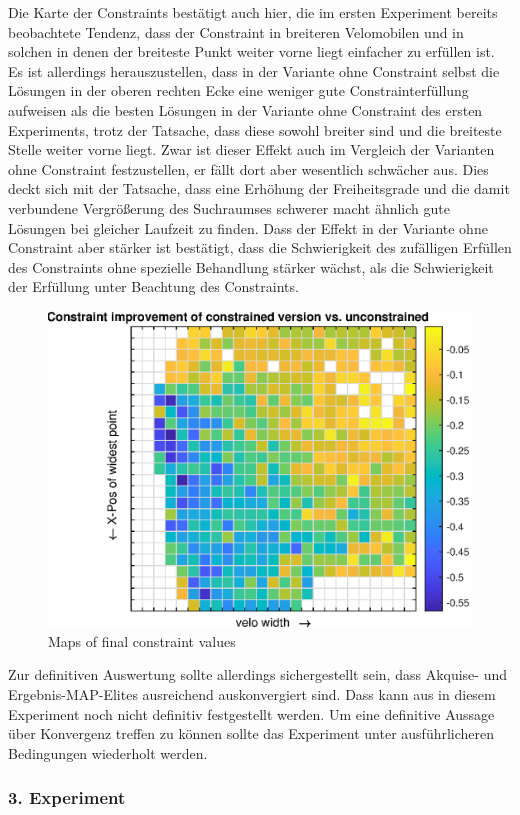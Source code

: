 Die Karte der Constraints bestätigt auch hier, die im ersten Experiment bereits beobachtete Tendenz, dass der Constraint in breiteren Velomobilen und in solchen in denen der breiteste Punkt weiter vorne liegt einfacher zu erfüllen ist.
Es ist allerdings herauszustellen, dass in der Variante ohne Constraint selbst die Lösungen in der oberen rechten Ecke eine weniger gute Constrainterfüllung aufweisen als die besten Lösungen in der Variante ohne Constraint des ersten Experiments, trotz der Tatsache, dass diese sowohl breiter sind und die breiteste Stelle weiter vorne liegt.
Zwar ist dieser Effekt auch im Vergleich der Varianten ohne Constraint festzustellen, er fällt dort aber wesentlich schwächer aus.
Dies deckt sich mit der Tatsache, dass eine Erhöhung der Freiheitsgrade und die damit verbundene Vergrößerung des Suchraumses schwerer macht ähnlich gute Lösungen bei gleicher Laufzeit zu finden.
Dass der Effekt in der Variante ohne Constraint aber stärker ist bestätigt, dass die Schwierigkeit des zufälligen Erfüllen des Constraints ohne spezielle Behandlung stärker wächst, als die Schwierigkeit der Erfüllung unter Beachtung des Constraints.

\begin{figure}[h]
	\centering
	\includegraphics[width=.7\linewidth]{bilder/6pt500Samples/constraintImprovements}
	\caption{Maps of final constraint values}
	\label{fig:2ndmapConCompare}
\end{figure}

Zur definitiven Auswertung sollte allerdings sichergestellt sein, dass Akquise- und Ergebnis-MAP-Elites ausreichend auskonvergiert sind.
Dass kann aus in diesem Experiment noch nicht definitiv festgestellt werden.
Um eine definitive Aussage über Konvergenz treffen zu können sollte das Experiment unter ausführlicheren Bedingungen wiederholt werden.

\subsubsection{3. Experiment}

